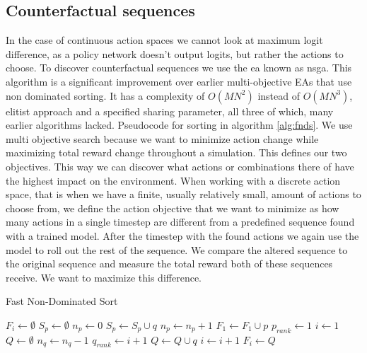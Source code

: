 \documentclass[UKenglish]{uiomasterthesis}
\begin{document}
\subsection{Counterfactual sequences}
\label{sec:counterfactual}
In the case of continuous action spaces we cannot look at maximum logit difference, as a policy network doesn't output logits, but rather the actions to choose. To discover counterfactual sequences we use the \ac{ea} known as \ac{nsga}. This algorithm is a significant improvement over earlier multi-objective EAs that use non dominated sorting. It has a complexity of $O(MN^2)$ instead of $O(MN^3)$, elitist approach and a specified sharing parameter, all three of which, many earlier algorithms lacked. \cite{Deb2001AFA} Pseudocode for sorting in algorithm \ref{alg:fnds}. 
We use multi objective search because we want to minimize action change while maximizing total reward change throughout a simulation. This defines our two objectives. This way we can discover what actions or combinations there of have the highest impact on the environment. When working with a discrete action space, that is when we have a finite, usually relatively small, amount of actions to choose from, we define the action objective that we want to minimize as how many actions in a single timestep are different from a predefined sequence found with a trained model. After the timestep with the found actions we again use the model to roll out the rest of the sequence. We compare the altered sequence to the original sequence and measure the total reward both of these sequences receive. We want to maximize this difference. 

\begin{algorithm}
\caption{Fast Non-Dominated Sort}
\label{alg:fnds}
\begin{algorithmic}
    \State $F_i \gets \emptyset$
    \State $S_p \gets \emptyset$
    \State $n_p \gets 0$
                \State $S_p \gets S_p \cup q$
                \State $n_p \gets n_p + 1$
            \EndIf
        \EndFor
            \State $F_1 \gets F_1 \cup p$
            \State $p_{rank} \gets 1$
        \EndIf
    \EndFor
    \State $i \gets 1$
        \State $Q \gets \emptyset$
                \State $n_q \gets n_q - 1$
                    \State $q_{rank} \gets i + 1$
                    \State $Q \gets Q \cup q$
                \EndIf
            \EndFor
        \EndFor
        \State $i \gets i + 1$
        \State $F_i \gets Q$
    \EndWhile
\end{algorithmic}
\end{algorithm}
\end{document}
